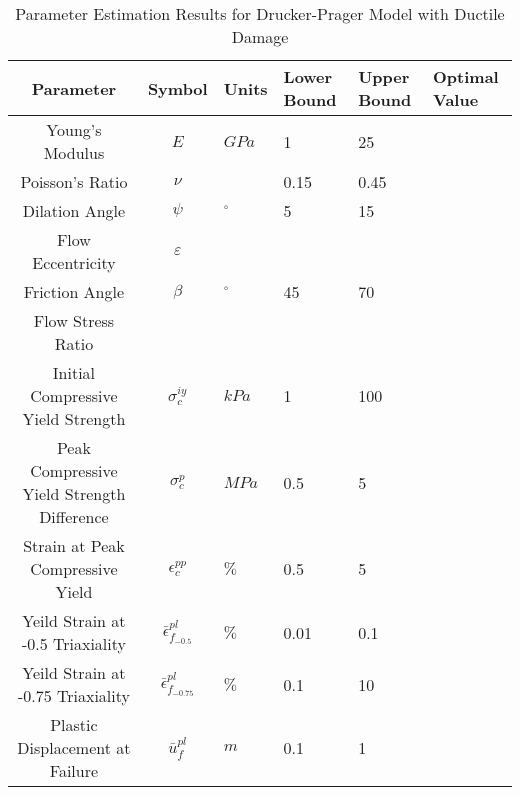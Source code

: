\begin{table}[]
\centering
\caption{Parameter Estimation Results for Drucker-Prager Model with Ductile Damage}
\label{tab:paramDrucker}
\begin{tabular}{ccllll}
\hline
Parameter                                  & Symbol                            & Units      & Lower Bound & Upper Bound & Optimal Value \\ \hline
Young's Modulus                            & $E$                               & $GPa$      & 1           & 25          &               \\
Poisson's Ratio                            & $\nu$                             &            & 0.15        & 0.45        &               \\
Dilation Angle                             & $\psi$                            & $^{\circ}$ & 5           & 15          &               \\
Flow Eccentricity                          & $\varepsilon$                     &            &             &             &               \\
Friction Angle                             & $\beta$                           & $^{\circ}$ & 45          & 70          &               \\
Flow Stress Ratio                          &                                   &            &             &             &               \\
Initial Compressive Yield Strength         & $\sigma_c^{iy}$                   & $kPa$      & 1           & 100         &               \\
Peak Compressive Yield Strength Difference & $\sigma_c^{p}$                    & $MPa$      & 0.5         & 5           &               \\
Strain at Peak Compressive Yield           & $\epsilon_c^{pp}$                 & $\%$       & 0.5         & 5           &               \\
Yeild Strain at -0.5 Triaxiality           & $\bar{\epsilon}^{pl}_{f_{-0.5}}$  & $\%$       & 0.01        & 0.1         &               \\
Yeild Strain at -0.75 Triaxiality          & $\bar{\epsilon}^{pl}_{f_{-0.75}}$ & $\%$       & 0.1         & 10          &               \\
Plastic Displacement at Failure            & $\bar{u}^{pl}_f$                  & $m$        & 0.1         & 1           &               \\ \hline
\end{tabular}
\end{table}

